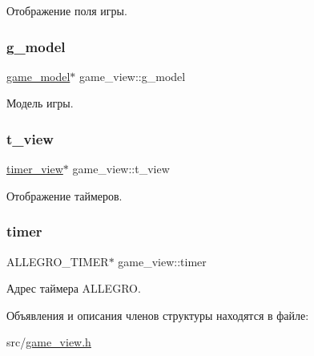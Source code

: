 Отображение поля игры. 

\mbox{\label{structgame__view_a09b15cc54d9bc6ea5e6d67bd27639b47}} 
\subsubsection{\texorpdfstring{g\+\_\+model}{g\_model}}
{\footnotesize\ttfamily \hyperlink{structgame__model}{game\+\_\+model}$\ast$ game\+\_\+view\+::g\+\_\+model}



Модель игры. 

\mbox{\label{structgame__view_a0490cc44940b39d3be15cb3d543988f2}} 
\subsubsection{\texorpdfstring{t\+\_\+view}{t\_view}}
{\footnotesize\ttfamily \hyperlink{structtimer__view}{timer\+\_\+view}$\ast$ game\+\_\+view\+::t\+\_\+view}



Отображение таймеров. 

\mbox{\label{structgame__view_a331f2383ff30abbee83ed4765cce229a}} 
\subsubsection{\texorpdfstring{timer}{timer}}
{\footnotesize\ttfamily A\+L\+L\+E\+G\+R\+O\+\_\+\+T\+I\+M\+ER$\ast$ game\+\_\+view\+::timer}



Адрес таймера A\+L\+L\+E\+G\+RO. 



Объявления и описания членов структуры находятся в файле\+:\begin{DoxyCompactItemize}
\item 
src/\hyperlink{game__view_8h}{game\+\_\+view.\+h}\end{DoxyCompactItemize}
